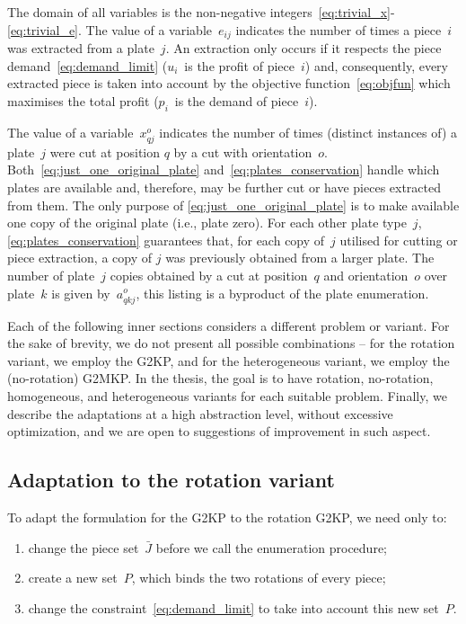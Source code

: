 The domain of all variables is the non-negative integers~\eqref{eq:trivial_x}-\eqref{eq:trivial_e}.
The value of a variable~\(e_{ij}\) indicates the number of times a piece~\(i\) was extracted from a  plate~\(j\).
An extraction only occurs if it respects the piece demand~\eqref{eq:demand_limit} (\(u_i\)~is the profit of piece~\(i\)) and, consequently, every extracted piece is taken into account by the objective function~\eqref{eq:objfun} which maximises the total profit (\(p_i\)~is the demand of piece~\(i\)).

The value of a variable~\(x^o_{qj}\) indicates the number of times (distinct instances of) a plate~\(j\) were cut at position \(q\) by a cut with orientation~\(o\).
Both~\eqref{eq:just_one_original_plate} and~\eqref{eq:plates_conservation} handle which plates are available and, therefore, may be further cut or have pieces extracted from them.
The only purpose of \eqref{eq:just_one_original_plate} is to make available one copy of the original plate (i.e., plate zero).
For each other plate type~\(j\), \eqref{eq:plates_conservation} guarantees that, for each copy of~\(j\) utilised for cutting or piece extraction, a copy of \(j\) was previously obtained from a larger plate.
The number of plate~\(j\) copies obtained by a cut at position~\(q\) and orientation~\(o\) over plate~\(k\) is given by~\(a^o_{qkj}\), this listing is a byproduct of the plate enumeration.

Each of the following inner sections considers a different problem or variant.
For the sake of brevity, we do not present all possible combinations -- for the rotation variant, we employ the G2KP, and for the heterogeneous variant, we employ the (no-rotation) G2MKP.
In the thesis, the goal is to have rotation, no-rotation, homogeneous, and heterogeneous variants for each suitable problem.
Finally, we describe the adaptations at a high abstraction level, without excessive optimization, and we are open to suggestions of improvement in such aspect.

\subsection{Adaptation to the rotation variant}

To adapt the formulation for the G2KP to the rotation G2KP, we need only to:

\begin{enumerate}
\item change the piece set~\(\bar{J}\) before we call the enumeration procedure;\label{item:J_change}
\item create a new set~\(P\), which binds the two rotations of every piece;\label{item:P_creation}
\item change the constraint~\eqref{eq:demand_limit} to take into account this new set~\(P\).\label{item:demand_con_change}
\end{enumerate}

